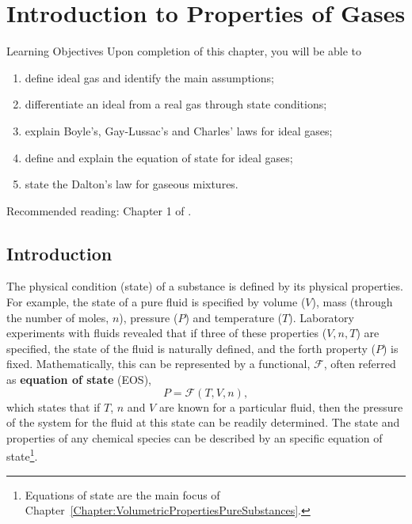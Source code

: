 
\chapter{Introduction to Properties of Gases}\label{Chapter:Intro_Property_of_Gases}

   \begin{LearningObjectivesBlock}{Learning Objectives}
      Upon completion of this chapter, you will be able to
        \begin{enumerate}
           \item define ideal gas and identify the main assumptions;
           \item differentiate an ideal from a real gas through state conditions;
           \item explain Boyle's, Gay-Lussac's and Charles' laws for ideal gases;
           \item define and explain the equation of state for ideal gases;
           \item state the Dalton's law for gaseous mixtures.
        \end{enumerate}
\medskip
     Recommended reading: Chapter 1 of \citet{Atkins_Book,Adamson_BookChapter}.
   \end{LearningObjectivesBlock}


\localtableofcontents
   
     \section{Introduction}\label{Chapter:Intro_Property_of_Gases:Section:Intro}

   The physical condition (\ie state) of a substance is defined by its physical properties. For example, the state of a pure fluid is specified by volume ($V$), mass (through the number of moles, $n$), pressure ($P$) and temperature ($T$). Laboratory experiments with fluids revealed that if three of these properties (\eg $V, n, T$) are specified, the state of the fluid is naturally defined, and the forth property (\ie $P$) is fixed. Mathematically, this can be represented by a functional, $\mathcal{F}$, often referred as {\bf equation of state} (EOS),
     \begin{displaymath}
       P = \mathcal{F}(T,V,n),
     \end{displaymath}
     which states that if $T$, $n$ and $V$ are known for a particular fluid, then the pressure of the system for the fluid at this state can be readily determined. The state and properties of any chemical species can be described by an specific equation of state\footnote{Equations of state are the main focus of Chapter~\ref{Chapter:VolumetricPropertiesPureSubstances}.}.
   
